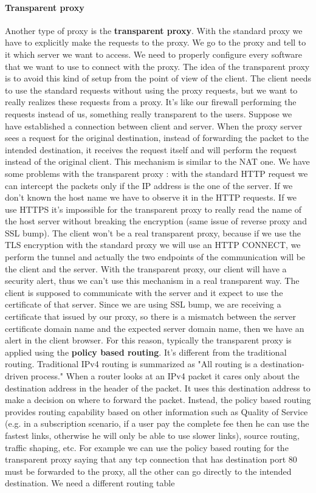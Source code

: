 \documentclass[11pt]{article}
\begin{document}
\paragraph{Transparent proxy} Another type of proxy is the \textbf{transparent proxy}. With the standard proxy we have to explicitly make the requests to the proxy. We go to the proxy and tell to it which server we want to access. We need to properly configure every software that we want to use to connect with the proxy. The idea of the transparent proxy is to avoid this kind of setup from the point of view of the client. The client needs to use the standard requests without using the proxy requests, but we want to really realizes these requests from a proxy. It's like our firewall performing the requests instead of us, something really transparent to the users. Suppose we have established a connection between client and server. When the proxy server sees a request for the original destination, instead of forwarding the packet to the intended destination, it receives the request itself and will perform the request instead of the original client. This mechanism is similar to the NAT one. We have some problems with the transparent proxy : with the standard HTTP request we can intercept the packets only if the IP address is the one of the server. If we don't known the host name we have to observe it in the HTTP requests. If we use HTTPS it's impossible for the transparent proxy to really read the name of the host server without breaking the encryption (same issue of reverse proxy and SSL bump). The client won't be a real transparent proxy, because if we use the TLS encryption with the standard proxy we will use an HTTP CONNECT, we perform the tunnel and actually the two endpoints of the communication will be the client and the server. With the transparent proxy, our client will have a security alert, thus we can't use this mechanism in a real transparent way. The client is supposed to communicate with the server and it expect to use the certificate of that server. Since we are using SSL bump, we are receiving a certificate that issued by our proxy, so there is a mismatch between the server certificate domain name and the expected server domain name, then we have an alert in the client browser. For this reason, typically the transparent proxy is applied using the \textbf{policy based routing}. It's different from the traditional routing. Traditional IPv4 routing is summarized as "All routing is a destination-driven process." When a router looks at an IPv4 packet it cares only about the destination address in the header of the packet. It uses this destination address to make a decision on where to forward the packet. Instead, the policy based routing provides routing capability based on other information such as Quality of Service (e.g. in a subscription scenario, if a user pay the complete fee then he can use the fastest links, otherwise he will only be able to use slower links), source routing, traffic shaping, etc. For example we can use the policy based routing for the transparent proxy saying that any tcp connection that has destination port 80 must be forwarded to the proxy, all the other can go directly to the intended destination. We need a different routing table 
\end{document}
